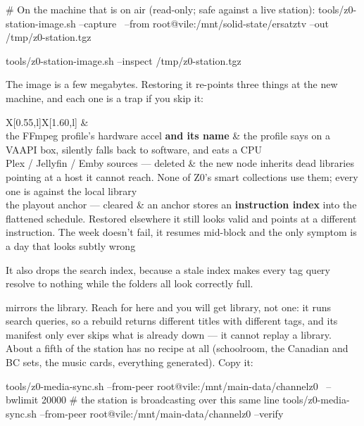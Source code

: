 \documentclass[fontpath=fonts/,logopath=logo/]{riposte-doc}
\begin{document}
\ripcodeopen
{}
\begin{ripcodeblock}
# On the machine that is on air (read-only; safe against a live station):
tools/z0-station-image.sh --capture \
  --from root@vile:/mnt/solid-state/ersatztv --out /tmp/z0-station.tgz

tools/z0-station-image.sh --inspect /tmp/z0-station.tgz
\end{ripcodeblock}
\ripcodesizereset\ripcodeclose

The image is a few megabytes. Restoring it re-points three things at the new machine, and each one is a trap if you skip it:

\begin{ripmdtable}{X[0.55,l]X[1.60,l]}
 &  \\
the FFmpeg profile's hardware accel \textbf{and its name} & the profile says  on a VAAPI box, silently falls back to software, and eats a CPU \\
Plex / Jellyfin / Emby sources — deleted & the new node inherits dead libraries pointing at a host it cannot reach. None of Z0's smart collections use them; every one is  against the local library \\
the playout anchor — cleared & an anchor stores an \textbf{instruction index} into the flattened schedule. Restored elsewhere it still looks valid and points at a different instruction. The week doesn't fail, it resumes mid-block and the only symptom is a day that looks subtly wrong \\
\end{ripmdtable}

It also drops the search index, because a stale index makes every tag query resolve to nothing while the folders all look correctly full.

\textbf{} mirrors the library. Reach for  here and you will get  library, not  one: it runs search queries, so a rebuild returns different titles with different tags, and its manifest only ever skips what is already down — it cannot replay a library. About a fifth of the station has no recipe at all (schoolroom, the Canadian and BC sets, the music cards, everything generated). Copy it:

\ripcodeopen
{}
\begin{ripcodeblock}
tools/z0-media-sync.sh --from-peer root@vile:/mnt/main-data/channelz0 \
  --bwlimit 20000        # the station is broadcasting over this same line
tools/z0-media-sync.sh --from-peer root@vile:/mnt/main-data/channelz0 --verify
\end{ripcodeblock}
\ripcodesizereset\ripcodeclose
\end{document}
